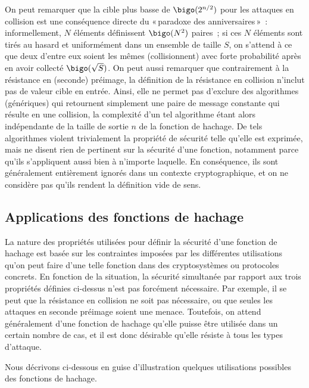 On peut remarquer que la cible plus basse de 
$\bigo(2^{n/2})$ pour les attaques en collision est une conséquence directe du
«\,paradoxe des anniversaires\,»~: informellement, 
$N$ éléments définissent $\bigo(N^2)$ paires~; si ces $N$ éléments sont tirés au hasard et uniformément dans un ensemble de taille $S$,
on s'attend à ce que deux d'entre eux soient les mêmes (collisionnent) avec forte probabilité après en avoir collecté
$\bigo(\sqrt{S})$. 
On peut aussi remarquer que contrairement à la résistance en (seconde) préimage, la définition de la résistance en collision n'inclut pas de valeur
cible en entrée.
Ainsi, elle ne permet pas d'exclure des algorithmes (génériques) qui retournent simplement une paire de message constante qui résulte en une collision,
la complexité d'un tel algorithme étant alors indépendante de la taille de sortie $n$ de la fonction de hachage.
De tels algorithmes violent trivialement la propriété de sécurité telle qu'elle est exprimée, mais ne disent rien de pertinent sur la sécurité d'une fonction,
notamment parce qu'ils
s'appliquent aussi bien à n'importe laquelle. En conséquence, ils sont généralement entièrement ignorés dans un contexte cryptographique, et
on ne considère pas qu'ils rendent la
définition vide de sens.

\subsection{Applications des fonctions de hachage}

La nature des propriétés utilisées pour définir la sécurité d'une fonction de hachage est basée sur les contraintes imposées par les différentes utilisations qu'on peut faire
d'une telle fonction dans des cryptosystèmes ou protocoles concrets.
En fonction de la situation, la sécurité simultanée par rapport aux trois propriétés définies ci-dessus n'est pas forcément nécessaire. Par exemple, il se peut que la résistance
en collision ne soit pas nécessaire, ou que seules les attaques en seconde préimage soient une menace. Toutefois, on attend généralement d'une fonction de hachage qu'elle puisse être utilisée
dans un certain nombre de cas, et il est donc désirable qu'elle résiste à tous les types d'attaque.

Nous décrivons ci-dessous en guise d'illustration quelques utilisations possibles des fonctions de hachage.


